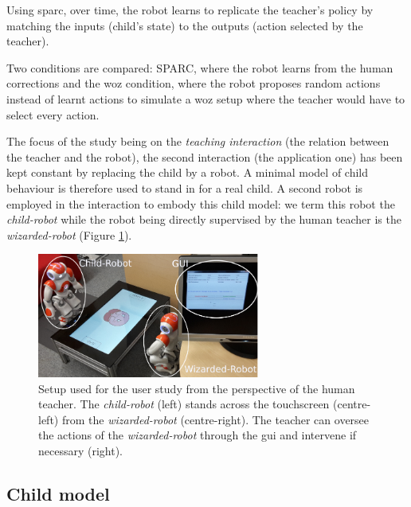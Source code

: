 Using \gls{sparc}, over time, the robot learns to replicate the teacher's policy by matching the inputs (child's state) to the outputs (action selected by the teacher). 


Two conditions are compared: SPARC, where the robot learns from the human corrections and the \gls{woz} condition, where the robot proposes random actions instead of learnt actions to simulate a \gls{woz} setup where the teacher would have to select every action.

The focus of the study being on the \textit{teaching interaction} (the relation between the teacher and the robot), the second interaction (the application one) has been kept constant by replacing the child by a robot. A minimal model of child behaviour is therefore used to stand in for a real child. A second robot is employed in the interaction to embody this child model: we term this robot the \textit{child-robot} while the robot being directly supervised by the human teacher is the \textit{wizarded-robot} (Figure \ref{fig:woz_setup}).

\begin{figure}[ht]
	\centering
	\includegraphics[width=0.65\textwidth]{setup_annotated.png}
	\caption{Setup used for the user study from the perspective of the human teacher. The \textit{child-robot} (left) stands across the touchscreen (centre-left) from the \textit{wizarded-robot} (centre-right). The teacher can oversee the actions of the \textit{wizarded-robot} through the \gls{gui} and intervene if necessary (right).}
	\label{fig:woz_setup}
\end{figure}
		
\subsection{Child model} \label{ssec:woz_child}


